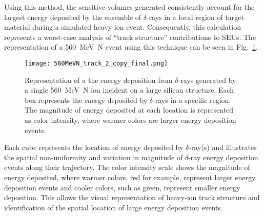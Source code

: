 Using this method, the sensitive volumes generated consistently account for the largest energy deposited by the ensemble of $\delta$-rays in a local region of target material during a simulated heavy-ion event. 
Consequently, this calculation represents a worst-case analysis of ``track structure'' contributions to SEUs. 
The representation of a 560~MeV~N event using this technique can be seen in Fig.~\ref{fig:560_MeV_N_track}.
\begin{figure}[tb]
     \begin{center}
         \texttt{[image: 560MeVN\_track\_2\_copy\_final.png]}
     \end{center}
     \caption{Representation of a the energy deposition from $\delta$-rays generated by a single 560~MeV~N ion incident on a large silicon structure. Each box represents the energy deposited by $\delta$-rays in a specific region. The magnitude of energy deposited at each location is represented as color intensity, where warmer colors are larger energy deposition events.}
     \label{fig:560_MeV_N_track}
 \end{figure} 
Each cube represents the location of energy deposited by $\delta$-ray(s) and illustrates the spatial non-uniformity and variation in magnitude of $\delta$-ray energy deposition events along their trajectory. 
The color intensity scale shows the magnitude of energy deposited, where warmer colors, red for example, represent larger energy deposition events and cooler colors, such as green, represent smaller energy deposition. 
This allows the visual representation of heavy-ion track structure and identification of the spatial location of large energy deposition events.

